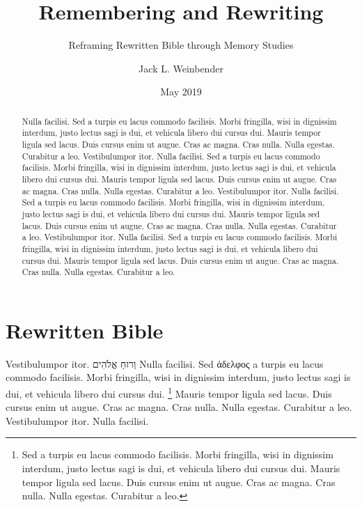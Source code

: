 \documentclass[letterpaper,12pt,oneside]{utexas-dissertation}
\begin{document}
\frontmatter

\author{Jack L. Weinbender}
\title{Remembering and Rewriting}
\subtitle{Reframing Rewritten Bible through Memory Studies}
\date{May 2019}
\maketitle


\makecopyright


\makesignatures

\begin{abstract}
Nulla facilisi. Sed a turpis eu lacus commodo facilisis. Morbi fringilla, wisi in dignissim interdum, justo lectus sagi is dui, et vehicula libero dui cursus dui. Mauris tempor ligula sed lacus. Duis cursus enim ut augue. Cras ac magna. Cras nulla. Nulla egestas. Curabitur a leo.  
Vestibulumpor itor. Nulla facilisi. Sed a turpis eu lacus commodo facilisis. Morbi fringilla, wisi in dignissim interdum, justo lectus sagi is dui, et vehicula libero dui cursus dui. Mauris tempor ligula sed lacus. Duis cursus enim ut augue. Cras ac magna. Cras nulla. Nulla egestas. Curabitur a leo. 
Vestibulumpor itor. Nulla facilisi. Sed a turpis eu lacus commodo facilisis. Morbi fringilla, wisi in dignissim interdum, justo lectus sagi is dui, et vehicula libero dui cursus dui. Mauris tempor ligula sed lacus. Duis cursus enim ut augue. Cras ac magna. Cras nulla. Nulla egestas. Curabitur a leo.  
Vestibulumpor itor. Nulla facilisi. Sed a turpis eu lacus commodo facilisis. Morbi fringilla, wisi in dignissim interdum, justo lectus sagi is dui, et vehicula libero dui cursus dui. Mauris tempor ligula sed lacus. Duis cursus enim ut augue. Cras ac magna. Cras nulla. Nulla egestas. Curabitur a leo.
\end{abstract}
\restoregeometry

\tableofcontents*

\mainmatter

\chapter{Rewritten Bible}
Vestibulumpor itor. {\hebrew וְרוּחַ אֱלֹהִים} Nulla facilisi. Sed {\greek ἀδελφος} a turpis eu lacus commodo facilisis. Morbi fringilla, wisi in dignissim interdum, justo lectus sagi is dui, et vehicula libero dui cursus dui. \footnote{Sed a turpis eu lacus commodo facilisis. Morbi fringilla, wisi in dignissim interdum, justo lectus sagi is dui, et vehicula libero dui cursus dui. Mauris tempor ligula sed lacus. Duis cursus enim ut augue. Cras ac magna. Cras nulla. Nulla egestas. Curabitur a leo.} Mauris tempor ligula sed lacus. Duis cursus enim ut augue. Cras ac magna. Cras nulla. Nulla egestas. Curabitur a leo.  
Vestibulumpor itor. Nulla facilisi. 
\end{document}
